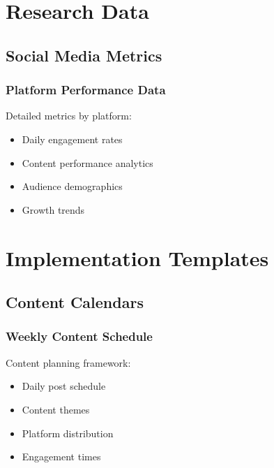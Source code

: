 \documentclass[12pt]{report}
\begin{document}
\appendix
\chapter{Research Data}

\section{Social Media Metrics}
\subsection{Platform Performance Data}
Detailed metrics by platform:
\begin{itemize}
    \item Daily engagement rates
    \item Content performance analytics
    \item Audience demographics
    \item Growth trends
\end{itemize}

\chapter{Implementation Templates}

\section{Content Calendars}
\subsection{Weekly Content Schedule}
Content planning framework:
\begin{itemize}
    \item Daily post schedule
    \item Content themes
    \item Platform distribution
    \item Engagement times
\end{itemize}
\end{document}

